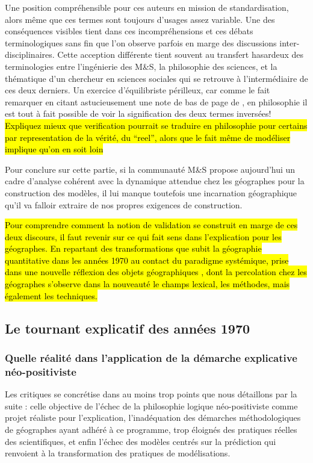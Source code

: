 Une position compréhensible pour ces auteurs en mission de standardisation, alors même que ces termes sont toujours d'usages assez variable. Une des conséquences visibles tient dans ces incompréhensions et ces débats terminologiques sans fin \autocite{David2009} que l'on observe parfois en marge des discussions inter-disciplinaires. Cette acception différente tient souvent au transfert hasardeux des terminologies entre l'ingénierie des M\&S, la philosophie des sciences, et la thématique d'un chercheur en sciences sociales qui se retrouve à l'intermédiaire de ces deux derniers. Un exercice d'équilibriste périlleux, car comme le fait remarquer \textcite{Kleijnen1995} en citant astucieusement une note de bas de page de \textcite{Barlas1990}, en philosophie il est tout à fait possible de voir la signification des deux termes inversées! \hl{Expliquez mieux que verification pourrait se traduire en philosophie pour certains par representation de la vérité, du “reel”, alors que le fait même de modéliser implique qu’on en soit loin}

Pour conclure sur cette partie, si la communauté M\&S propose aujourd'hui un cadre d'analyse cohérent avec la dynamique attendue chez les géographes pour la construction des modèles, il lui manque toutefois une incarnation géographique qu'il va falloir extraire de nos propres exigences de construction.

\hl{Pour comprendre comment la notion de validation se construit en marge de ces deux discours, il faut revenir sur ce qui fait sens dans l'explication pour les géographes. En repartant des transformations que subit la géographie quantitative dans les années 1970 au contact du paradigme systémique, prise dans une nouvelle réflexion des objets géographiques , dont la percolation chez les géographes s'observe dans la nouveauté le champs lexical, les méthodes, mais également les techniques.}


\subsection{Le tournant explicatif des années 1970} 
\label{ssec:transition_annee70}

\subsubsection{Quelle réalité dans l'application de la démarche explicative néo-positiviste}
\label{sssec:realite_neopositiviste}

Les critiques se concrétise dans au moins trop points que nous détaillons par la suite : celle objective de l'échec de la philosophie logique néo-positiviste comme projet réaliste pour l'explication, l'inadéquation des démarches méthodologiques de géographes ayant adhéré à ce programme, trop éloignés des pratiques réelles des scientifiques, et enfin l’échec des modèles centrés sur la prédiction qui renvoient à la transformation des pratiques de modélisations.

